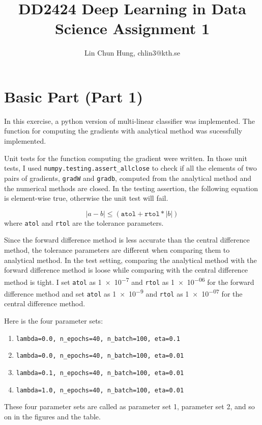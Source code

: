 \documentclass[12pt]{article}
\begin{document}
\title{DD2424 Deep Learning in Data Science Assignment 1}
\author{Lin Chun Hung, chlin3@kth.se}

\maketitle

\section{Basic Part (Part 1)}
In this exercise, a python version of multi-linear classifier was implemented.
The function for computing the gradients with analytical method was sucessfully implemented.

Unit tests for the function computing the gradient were written. In those unit tests,
I used \texttt{numpy.testing.assert\_allclose} to check if all the elements of two pairs of gradients,
\texttt{gradW} and \texttt{gradb}, computed from the analytical method and the numerical methods are closed.
In the testing assertion, the following equation is element-wise true, otherwise the unit test will fail.

\begin{equation*}
    |a - b| \leq (\texttt{atol} + \texttt{rtol} * |b|)
\end{equation*}
where \texttt{atol} and \texttt{rtol} are the tolerance parameters.

Since the forward difference method is less accurate than the central difference method,
the tolerance parameters are different when comparing them to analytical method.
In the test setting, comparing the analytical method with
the forward difference method is loose while
comparing with the central difference method is tight.
I set \texttt{atol} as \num{1e-7} and \texttt{rtol} as \num{1e-06} for the
forward difference method and set \texttt{atol} as \num{1e-9} and \texttt{rtol} as \num{1e-07}
for the central difference method.

Here is the four parameter sets:
\begin{enumerate}
    \item  \texttt{lambda=0.0, n\_epochs=40, n\_batch=100, eta=0.1}
    \item  \texttt{lambda=0.0, n\_epochs=40, n\_batch=100, eta=0.01}
    \item  \texttt{lambda=0.1, n\_epochs=40, n\_batch=100, eta=0.01}
    \item  \texttt{lambda=1.0, n\_epochs=40, n\_batch=100, eta=0.01}
\end{enumerate}
These four parameter sets are called as parameter set 1, parameter set 2,
and so on in the figures and the table.
\end{document}
